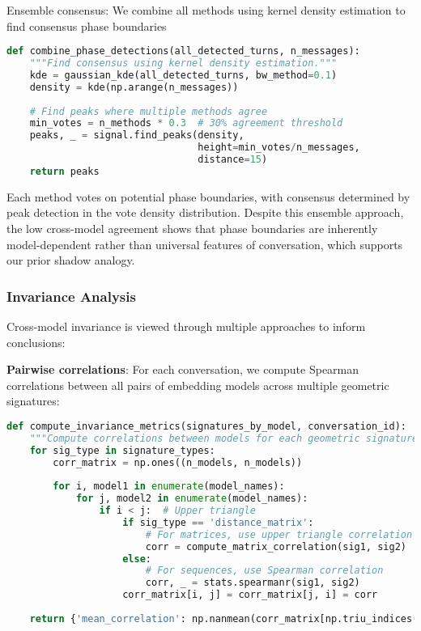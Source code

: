 \documentclass[11pt,letterpaper]{article}
\begin{document}
Ensemble consensus: We combine all methods using kernel density estimation to find consensus phase boundaries

\begin{lstlisting}[language=Python]
def combine_phase_detections(all_detected_turns, n_messages):
    """Find consensus using kernel density estimation."""
    kde = gaussian_kde(all_detected_turns, bw_method=0.1)
    density = kde(np.arange(n_messages))
    
    # Find peaks where multiple methods agree
    min_votes = n_methods * 0.3  # 30% agreement threshold
    peaks, _ = signal.find_peaks(density, 
                                 height=min_votes/n_messages, 
                                 distance=15)
    return peaks
\end{lstlisting}

Each method votes on potential phase boundaries, with consensus determined by peak detection in the vote density distribution. Despite this ensemble approach, the low cross-model agreement shows that phase boundaries are inherently model-dependent rather than universal features of conversation, which supports our prior shadow analogy.

\subsubsection{Invariance Analysis}

Cross-model invariance is viewed through multiple approaches to inform conclusions:

\textbf{Pairwise correlations}: For each conversation, we compute Spearman correlations between all pairs of embedding models across multiple geometric signatures:

\begin{lstlisting}[language=Python]
def compute_invariance_metrics(signatures_by_model, conversation_id):
    """Compute correlations between models for each geometric signature."""
    for sig_type in signature_types:
        corr_matrix = np.ones((n_models, n_models))
        
        for i, model1 in enumerate(model_names):
            for j, model2 in enumerate(model_names):
                if i < j:  # Upper triangle
                    if sig_type == 'distance_matrix':
                        # For matrices, use upper triangle correlation
                        corr = compute_matrix_correlation(sig1, sig2)
                    else:
                        # For sequences, use Spearman correlation
                        corr, _ = stats.spearmanr(sig1, sig2)
                    corr_matrix[i, j] = corr_matrix[j, i] = corr
    
    return {'mean_correlation': np.nanmean(corr_matrix[np.triu_indices(n_models, k=1)])}
\end{lstlisting}
\end{document}
